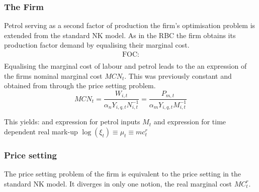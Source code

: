 \documentclass[12pt,a4paper,english]{article} %
\begin{document}
	\subsubsection{The Firm}
	Petrol serving as a second factor of production the firm's optimisation problem is extended from the standard NK model. As in the RBC the firm obtains its production factor demand by equalising their marginal cost. 
	\begin{equation}
		\begin{aligned}
			\textrm{FOC:} \\
		\end{aligned}
	\end{equation}
	Equalising the marginal cost of labour and petrol leads to the an expression of the firms nominal marginal cost $MCN_{t}$. This was previously constant and obtained from through the price setting problem.
	\begin{equation}
		MCN_t = \frac{W_{i,t}}{\alpha_n Y_{i,q,t} N_{i,t}^{-1}} = \frac{P_{m,t}}{\alpha_m Y_{i,q,t} M_{i,t}^{-1}}
	\end{equation}
	
	
	This yields:
	and expression for petrol inputs $M_t$
	and expression for time dependent real mark-up $\log(\xi_t) \equiv \mu_t \equiv mc_t^r$
	
	
	\subsubsection{Price setting}
	The price setting problem of the firm is equivalent to the price setting in the standard NK model. It diverges in only one notion, the real marginal cost $MC_t^r$. \\
	
\end{document}

